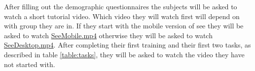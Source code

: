 After filling out the demographic questionnaires the subjects will be asked to watch a short tutorial video.
Which video they will watch first will depend on with group they are in.
If they start with the mobile version of \gls{see} they will be asked to watch \hyperref[calc]{SeeMobile.mp4} otherwise they will be asked to watch \hyperref[calc]{SeeDesktop.mp4}.
After completing their first training and their first two tasks, as described in table \ref{table:tasks}, they will be asked to watch the video they have not started with.

\begin{table}[htb]
\end{table}
